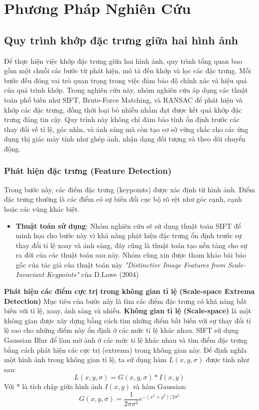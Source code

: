 \newpage
\section{Phương Pháp Nghiên Cứu}
\subsection{Quy trình khớp đặc trưng giữa hai hình ảnh}
Để thực hiện việc khớp đặc trưng giữa hai hình ảnh, quy trình tổng quan bao gồm một chuỗi các bước từ phát hiện, mô tả đến khớp và lọc các đặc trưng. Mỗi bước đều đóng vai trò quan trọng trong việc đảm bảo độ chính xác và hiệu quả của quá trình khớp. Trong nghiên cứu này, nhóm nghiên cứu áp dụng các thuật toán phổ biến như SIFT, Brute-Force Matching, và RANSAC để phát hiện và khớp các đặc trưng, đồng thời loại bỏ nhiễu nhằm đạt được kết quả khớp đặc trưng đáng tin cậy. Quy trình này không chỉ đảm bảo tính ổn định trước các thay đổi về tỉ lệ, góc nhìn, và ánh sáng mà còn tạo cơ sở vững chắc cho các ứng dụng thị giác máy tính như ghép ảnh, nhận dạng đối tượng và theo dõi chuyển động.
\subsubsection{Phát hiện đặc trưng (Feature Detection)}
Trong bước này, các điểm đặc trưng (keypoints) được xác định từ hình ảnh. Điểm đặc trưng thường là các điểm có sự biến đổi cục bộ rõ rệt như góc cạnh, cạnh hoặc các vùng khác biệt.
\begin{itemize}
	\item \textbf{Thuật toán sử dụng}: Nhóm nghiên cứu sẽ sử dụng thuật toán SIFT để minh họa cho bước này vì khả năng phát hiện đặc trưng ổn định trước sự thay đổi tỉ lệ xoay và ánh sáng, đây cũng là thuật toán tạo nền tảng cho sự ra đời của các thuật toán sau này. Nhóm cũng xin được tham khảo bài báo gốc của tác giả của thuật toán này \textit{"Distinctive Image Features from Scale-Invariant Keypoints"} của D.Lowe (2004)\cite{D.Lowe}
\end{itemize}
	
\textbf{Phát hiện các điểm cực trị trong không gian tỉ lệ (Scale-space Extrema Detection)}
Mục tiêu của bước này là tìm các điểm đặc trưng có khă năng bất biến với tỉ lệ, xoay, ánh sáng và nhiễu.
\textbf{Không gian tỉ lệ (Scale-space)} là một không gian được xây dựng bằng cách tìm những điểm bất biến với sự thay đổi tỉ lệ sao cho những điểm này ổn định ở các mức tỉ lệ khác nhau. SIFT sử dụng Gaussian Blur để làm mờ ảnh ở các mức tỉ lệ khác nhau và tìm điểm đặc trưng bằng cách phát hiện các cực trị (extrema) trong không gian này.
Để định nghĩa một hình ảnh trong không gian tỉ lệ, ta sử dụng hàm $L(x,y,\sigma)$ được tính như sau:
\[ L(x, y, \sigma) = G(x, y, \sigma) \ast I(x, y) \]
Với $\ast$ là tích chập giữa hình ảnh $I(x, y)$ và hàm Gaussian:
\[ G(x, y, \sigma) = \frac{1}{2\pi\sigma^{2}}e^{-(x^{2}+y^{2})/2\sigma^{2}} \]

